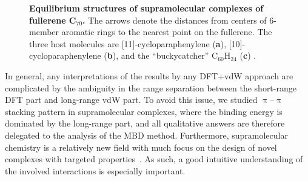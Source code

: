 \begin{figure}
{
}
\caption{\textbf{Equilibrium structures of supramolecular complexes of fullerene C$_{70}$.}
The arrows denote the distances from centers of 6-member aromatic rings to the nearest point on the fullerene.
The three host molecules are [11]-cycloparaphenylene (\textbf a), [10]-cycloparaphenylene (\textbf b), and the ``buckycatcher'' C$_{60}$H$_{24}$ (\textbf c) \citep{SygulaJACS07}.
}\label{fig:pipi-structures}
\end{figure}

In general, any interpretations of the results by any DFT+vdW approach are complicated by the ambiguity in the range separation between the short-range DFT part and long-range vdW part.
To avoid this issue, we studied $\uppi$--$\uppi$ stacking pattern in supramolecular complexes, where the binding energy is dominated by the long-range part, and all qualitative answers are therefore delegated to the analysis of the MBD method.
Furthermore, supramolecular chemistry is a relatively new field with much focus on the design of novel complexes with targeted properties~\cite{KawaseSCoFaCN12}.
As such, a good intuitive understanding of the involved interactions is especially important.

